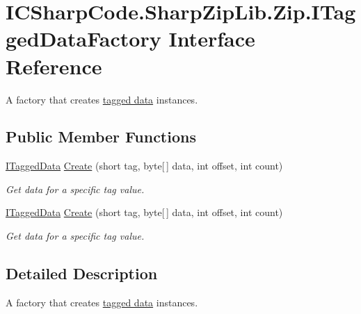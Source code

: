 \hypertarget{interface_i_c_sharp_code_1_1_sharp_zip_lib_1_1_zip_1_1_i_tagged_data_factory}{}\section{I\+C\+Sharp\+Code.\+Sharp\+Zip\+Lib.\+Zip.\+I\+Tagged\+Data\+Factory Interface Reference}
\label{interface_i_c_sharp_code_1_1_sharp_zip_lib_1_1_zip_1_1_i_tagged_data_factory}


A factory that creates \hyperlink{interface_i_c_sharp_code_1_1_sharp_zip_lib_1_1_zip_1_1_i_tagged_data}{tagged data} instances.  


\subsection*{Public Member Functions}
\begin{DoxyCompactItemize}
\item 
\hyperlink{interface_i_c_sharp_code_1_1_sharp_zip_lib_1_1_zip_1_1_i_tagged_data}{I\+Tagged\+Data} \hyperlink{interface_i_c_sharp_code_1_1_sharp_zip_lib_1_1_zip_1_1_i_tagged_data_factory_a1d3a69551748773c0f80eed4ce781269}{Create} (short tag, byte\mbox{[}$\,$\mbox{]} data, int offset, int count)
\begin{DoxyCompactList}\small\item\em Get data for a specific tag value. \end{DoxyCompactList}\item 
\hyperlink{interface_i_c_sharp_code_1_1_sharp_zip_lib_1_1_zip_1_1_i_tagged_data}{I\+Tagged\+Data} \hyperlink{interface_i_c_sharp_code_1_1_sharp_zip_lib_1_1_zip_1_1_i_tagged_data_factory_a1d3a69551748773c0f80eed4ce781269}{Create} (short tag, byte\mbox{[}$\,$\mbox{]} data, int offset, int count)
\begin{DoxyCompactList}\small\item\em Get data for a specific tag value. \end{DoxyCompactList}\end{DoxyCompactItemize}


\subsection{Detailed Description}
A factory that creates \hyperlink{interface_i_c_sharp_code_1_1_sharp_zip_lib_1_1_zip_1_1_i_tagged_data}{tagged data} instances. 



